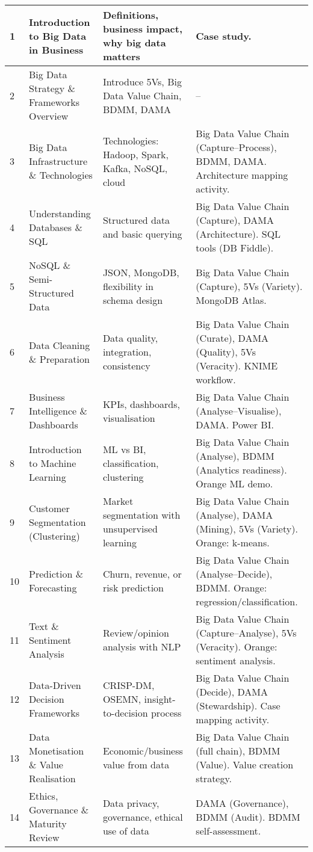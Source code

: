 \begin{longtable}{|p{}|p{}|p{}|p{}|}
	1 & Introduction to Big Data in Business & Definitions, business impact, why big data matters & Case study. \\
	\hline
	2 & Big Data Strategy \& Frameworks Overview & Introduce 5Vs, Big Data Value Chain, BDMM, DAMA & -- \\
	\hline
	3 & Big Data Infrastructure \& Technologies & Technologies: Hadoop, Spark, Kafka, NoSQL, cloud & Big Data Value Chain (Capture–Process), BDMM, DAMA. Architecture mapping activity. \\
	\hline
	4 & Understanding Databases \& SQL & Structured data and basic querying & Big Data Value Chain (Capture), DAMA (Architecture). SQL tools (DB Fiddle). \\
	\hline
	5 & NoSQL \& Semi-Structured Data & JSON, MongoDB, flexibility in schema design & Big Data Value Chain (Capture), 5Vs (Variety). MongoDB Atlas. \\
	\hline
	6 & Data Cleaning \& Preparation & Data quality, integration, consistency & Big Data Value Chain (Curate), DAMA (Quality), 5Vs (Veracity). KNIME workflow. \\
	\hline
	7 & Business Intelligence \& Dashboards & KPIs, dashboards, visualisation & Big Data Value Chain (Analyse–Visualise), DAMA. Power BI. \\
	\hline
	8 & Introduction to Machine Learning & ML vs BI, classification, clustering & Big Data Value Chain (Analyse), BDMM (Analytics readiness). Orange ML demo. \\
	\hline
	9 & Customer Segmentation (Clustering) & Market segmentation with unsupervised learning & Big Data Value Chain (Analyse), DAMA (Mining), 5Vs (Variety). Orange: k-means. \\
	\hline
	10 & Prediction \& Forecasting & Churn, revenue, or risk prediction & Big Data Value Chain (Analyse–Decide), BDMM. Orange: regression/classification. \\
	\hline
	11 & Text \& Sentiment Analysis & Review/opinion analysis with NLP & Big Data Value Chain (Capture–Analyse), 5Vs (Veracity). Orange: sentiment analysis. \\
	\hline
	12 & Data-Driven Decision Frameworks & CRISP-DM, OSEMN, insight-to-decision process & Big Data Value Chain (Decide), DAMA (Stewardship). Case mapping activity. \\
	\hline
	13 & Data Monetisation \& Value Realisation & Economic/business value from data & Big Data Value Chain (full chain), BDMM (Value). Value creation strategy. \\
	\hline
	14 & Ethics, Governance \& Maturity Review & Data privacy, governance, ethical use of data & DAMA (Governance), BDMM (Audit). BDMM self-assessment. \\
	\hline
	
\end{longtable}



